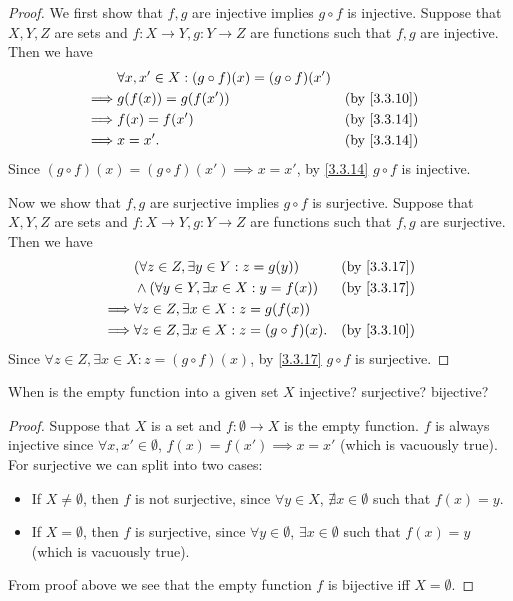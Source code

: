\begin{proof}
  We first show that \(f, g\) are injective implies \(g \circ f\) is injective.
  Suppose that \(X, Y, Z\) are sets and \(f : X \to Y, g : Y \to Z\) are functions such that \(f, g\) are injective.
  Then we have
  \begin{align*}
             & \forall x, x' \in X : (g \circ f)(x) = (g \circ f)(x')                  \\
    \implies & g(f(x)) = g(f(x'))                                     &  & \by{3.3.10} \\
    \implies & f(x) = f(x')                                           &  & \by{3.3.14} \\
    \implies & x = x'.                                                &  & \by{3.3.14}
  \end{align*}
  Since \((g \circ f)(x) = (g \circ f)(x') \implies x = x'\), by \cref{3.3.14} \(g \circ f\) is injective.

  Now we show that \(f, g\) are surjective implies \(g \circ f\) is surjective.
  Suppose that \(X, Y, Z\) are sets and \(f : X \to Y, g : Y \to Z\) are functions such that \(f, g\) are surjective.
  Then we have
  \begin{align*}
             & (\forall z \in Z, \exists y \in Y : z = g(y))          &  & \by{3.3.17} \\
             & \land (\forall y \in Y, \exists x \in X : y = f(x))    &  & \by{3.3.17} \\
    \implies & \forall z \in Z, \exists x \in X : z = g(f(x))                          \\
    \implies & \forall z \in Z, \exists x \in X : z = (g \circ f)(x). &  & \by{3.3.10}
  \end{align*}
  Since \(\forall z \in Z, \exists x \in X : z = (g \circ f)(x)\), by \cref{3.3.17} \(g \circ f\) is surjective.
\end{proof}

\begin{ex}\label{ex:3.3.3}
  When is the empty function into a given set \(X\) injective?
  surjective?
  bijective?
\end{ex}

\begin{proof}
  Suppose that \(X\) is a set and \(f : \emptyset \to X\) is the empty function.
  \(f\) is always injective since \(\forall x, x' \in \emptyset\), \(f(x) = f(x') \implies x = x'\) (which is vacuously true).
  For surjective we can split into two cases:
  \begin{itemize}
    \item If \(X \neq \emptyset\), then \(f\) is not surjective, since \(\forall y \in X\), \(\nexists x \in \emptyset\) such that \(f(x) = y\).
    \item If \(X = \emptyset\), then \(f\) is surjective, since \(\forall y \in \emptyset\), \(\exists x \in \emptyset\) such that \(f(x) = y\) (which is vacuously true).
  \end{itemize}
  From proof above we see that the empty function \(f\) is bijective iff \(X = \emptyset\).
\end{proof}

